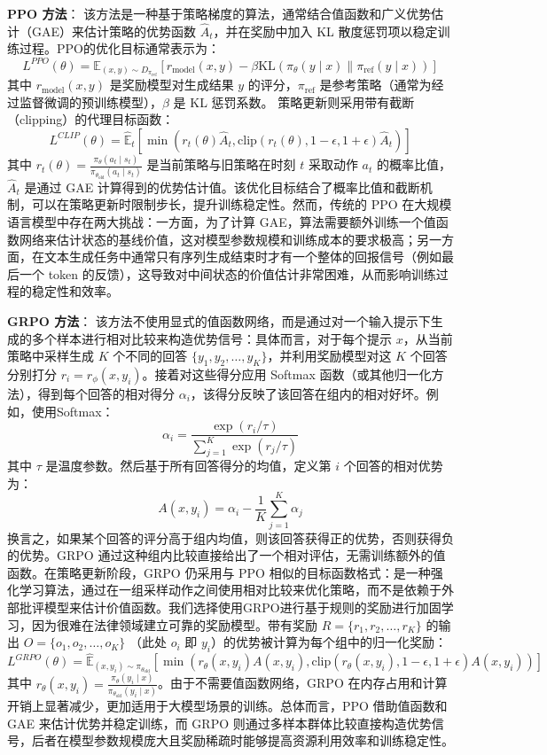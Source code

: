 \documentclass{pkuthesis}
\begin{document}
\textbf{PPO 方法}： 该方法是一种基于策略梯度的算法，通常结合值函数和广义优势估计（GAE）来估计策略的优势函数 $\hat{A}_t$，并在奖励中加入 KL 散度惩罚项以稳定训练过程。PPO的优化目标通常表示为：
$$L^{PPO}(\theta) = \mathbb{E}_{(x,y) \sim D_{\pi_{\text{ref}}}} \left[ r_{\text{model}}(x, y) - \beta \text{KL}(\pi_{\theta}(y \mid x) \| \pi_{\text{ref}}(y \mid x)) \right]$$
其中 $r_{\text{model}}(x, y)$ 是奖励模型对生成结果 $y$ 的评分，$\pi_{\text{ref}}$ 是参考策略（通常为经过监督微调的预训练模型），$\beta$ 是 KL 惩罚系数。
策略更新则采用带有截断（clipping）的代理目标函数：
$$ L^{CLIP}(\theta) = \hat{\mathbb{E}}_t \left[ \min(r_t(\theta)\hat{A}_t, \text{clip}(r_t(\theta), 1-\epsilon, 1+\epsilon)\hat{A}_t) \right] $$
其中 $r_t(\theta) = \frac{\pi_{\theta}(a_t \mid s_t)}{\pi_{\theta_{\text{old}}}(a_t \mid s_t)}$ 是当前策略与旧策略在时刻 $t$ 采取动作 $a_t$ 的概率比值，$\hat{A}_t$ 是通过 GAE 计算得到的优势估计值。该优化目标结合了概率比值和截断机制，可以在策略更新时限制步长，提升训练稳定性。然而，传统的 PPO 在大规模语言模型中存在两大挑战：一方面，为了计算 GAE，算法需要额外训练一个值函数网络来估计状态的基线价值，这对模型参数规模和训练成本的要求极高；另一方面，在文本生成任务中通常只有序列生成结束时才有一个整体的回报信号（例如最后一个 token 的反馈），这导致对中间状态的价值估计非常困难，从而影响训练过程的稳定性和效率。

\textbf{GRPO 方法}： 该方法不使用显式的值函数网络，而是通过对一个输入提示下生成的多个样本进行相对比较来构造优势信号：具体而言，对于每个提示 $x$，从当前策略中采样生成 $K$ 个不同的回答 $\{y_1, y_2, \dots, y_K\}$，并利用奖励模型对这 $K$ 个回答分别打分 $r_i = r_{\phi}(x, y_i)$。接着对这些得分应用 Softmax 函数（或其他归一化方法），得到每个回答的相对得分 $\alpha_i$，该得分反映了该回答在组内的相对好坏。例如，使用Softmax：
$$ \alpha_i = \frac{\exp(r_i / \tau)}{\sum_{j=1}^K \exp(r_j / \tau)} $$
其中 $\tau$ 是温度参数。然后基于所有回答得分的均值，定义第 $i$ 个回答的相对优势为：
$$ A(x, y_i) = \alpha_i - \frac{1}{K} \sum_{j=1}^K \alpha_j $$
换言之，如果某个回答的评分高于组内均值，则该回答获得正的优势，否则获得负的优势。GRPO 通过这种组内比较直接给出了一个相对评估，无需训练额外的值函数。在策略更新阶段，GRPO 仍采用与 PPO 相似的目标函数格式：是一种强化学习算法，通过在一组采样动作之间使用相对比较来优化策略，而不是依赖于外部批评模型来估计价值函数。我们选择使用GRPO进行基于规则的奖励进行加固学习，因为很难在法律领域建立可靠的奖励模型。带有奖励 $R = \{r_1, r_2, \dots, r_K\}$ 的输出 $O = \{o_1, o_2, \dots, o_K\}$ （此处 $o_i$ 即 $y_i$）的优势被计算为每个组中的归一化奖励：
$$ L^{GRPO}(\theta) = \hat{\mathbb{E}}_{(x, y_i) \sim \pi_{\theta_{\text{old}}}} \left[ \min(r_{\theta}(x,y_i)A(x,y_i), \text{clip}(r_{\theta}(x,y_i), 1-\epsilon, 1+\epsilon)A(x,y_i)) \right] $$
其中 $r_{\theta}(x, y_i) = \frac{\pi_{\theta}(y_i \mid x)}{\pi_{\theta_{\text{old}}}(y_i \mid x)}$。由于不需要值函数网络，GRPO 在内存占用和计算开销上显著减少，更加适用于大模型场景的训练。总体而言，PPO 借助值函数和 GAE 来估计优势并稳定训练，而 GRPO 则通过多样本群体比较直接构造优势信号，后者在模型参数规模庞大且奖励稀疏时能够提高资源利用效率和训练稳定性。
\end{document}
